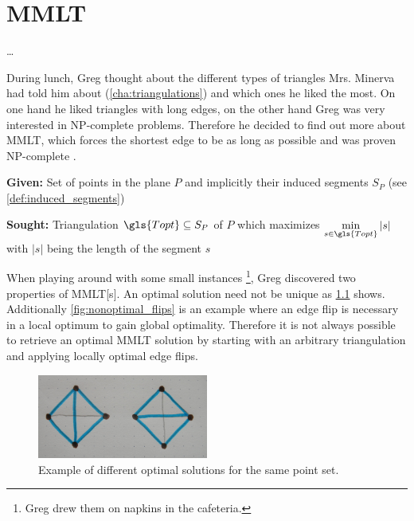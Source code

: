 \chapter{\texorpdfstring{\glsdesc{MMLT}}{MMLT}}\label{cha:mmlt}
\ldots{}

During lunch, Greg thought about the different types of triangles
Mrs. Minerva had told him about (\cref{cha:triangulations}) and which ones
he liked the most. On one hand he liked triangles with long edges,
on the other hand Greg was very interested in NP-complete problems.
Therefore he decided to find out more about \gls{MMLT}, which forces
the shortest edge to be as long as possible and was proven 
NP-complete \cite{mmlt_complexity}.

\begin{problem}
  \hfill
  \begin{labeling}{\hspace{4em}}
    \item[\textbf{Given:}]
      Set of points in the plane \(P\) and implicitly their induced segments
      \(S_P\) (see \cref{def:induced_segments})
    \item[\textbf{Sought:}]
      Triangulation \(\gls{Topt}\subseteq S_P\) of \(P\) which maximizes
      \(\min\limits_{s\in \gls{Topt}} |s|\) 
      with \(|s|\) being the length of the segment \(s\)
  \end{labeling}
\end{problem}

When playing around with some small instances \footnote{Greg drew them
on napkins in the cafeteria.}, Greg discovered two 
properties of \gls{MMLT}[s]. An optimal solution need not be unique as
\cref{fig:non_unique_optimal} shows. Additionally 
\cref{fig:nonoptimal_flips} is an example where an edge flip
 is necessary in a local optimum to gain 
global optimality. Therefore it is not always possible to retrieve an
optimal \gls{MMLT} solution by starting with an arbitrary
triangulation and applying locally optimal edge flips.

\begin{figure}[ht]
  \centering
  \includegraphics[width=0.5\textwidth]{img/non_unique_optimal.jpg}
  \caption{Example of different optimal solutions for the same point set.\label{fig:non_unique_optimal}}
\end{figure}

